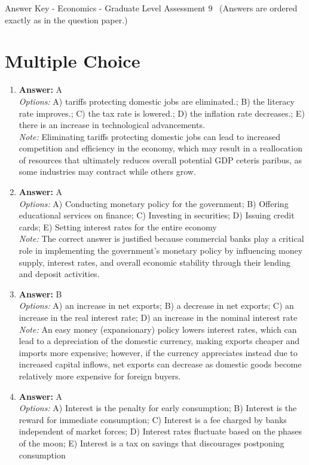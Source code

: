 \documentclass[12pt]{article}
\begin{document}
\begin{center}
Answer Key - Economics - Graduate Level Assessment 9 \
\small (Answers are ordered exactly as in the question paper.)
\end{center}

\section*{Multiple Choice}
\begin{enumerate}[label=\arabic*.]
\item \textbf{Answer:} A
\\ \textit{Options:} A) tariffs protecting domestic jobs are eliminated.; B) the literacy rate improves.; C) the tax rate is lowered.; D) the inflation rate decreases.; E) there is an increase in technological advancements.
\\ \textit{Note:} Eliminating tariffs protecting domestic jobs can lead to increased competition and efficiency in the economy, which may result in a reallocation of resources that ultimately reduces overall potential GDP ceteris paribus, as some industries may contract while others grow.
\item \textbf{Answer:} A
\\ \textit{Options:} A) Conducting monetary policy for the government; B) Offering educational services on finance; C) Investing in securities; D) Issuing credit cards; E) Setting interest rates for the entire economy
\\ \textit{Note:} The correct answer is justified because commercial banks play a critical role in implementing the government's monetary policy by influencing money supply, interest rates, and overall economic stability through their lending and deposit activities.
\item \textbf{Answer:} B
\\ \textit{Options:} A) an increase in net exports; B) a decrease in net exports; C) an increase in the real interest rate; D) an increase in the nominal interest rate
\\ \textit{Note:} An easy money (expansionary) policy lowers interest rates, which can lead to a depreciation of the domestic currency, making exports cheaper and imports more expensive; however, if the currency appreciates instead due to increased capital inflows, net exports can decrease as domestic goods become relatively more expensive for foreign buyers.
\item \textbf{Answer:} A
\\ \textit{Options:} A) Interest is the penalty for early consumption; B) Interest is the reward for immediate consumption; C) Interest is a fee charged by banks independent of market forces; D) Interest rates fluctuate based on the phases of the moon; E) Interest is a tax on savings that discourages postponing consumption

\end{enumerate}
\end{document}
